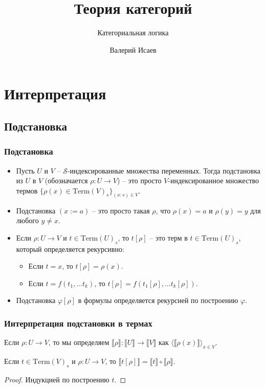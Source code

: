 \documentclass{beamer}
\theoremstyle{definition}
\renewcommand{\ll}{\llbracket}
\newcommand{\rr}{\rrbracket}
\newcommand{\fs}[1]{\mathrm{#1}}
\begin{document}
\title{Теория категорий}
\subtitle{Категориальная логика}
\author{Валерий Исаев}
\maketitle

\section{Интерпретация}

\subsection{Подстановка}

\begin{frame}
\frametitle{Подстановка}
\begin{itemize}
\item Пусть $U$ и $V$ -- $\mathcal{S}$-индексированные множества переменных. Тогда подстановка из $U$ в $V$ (обозначается $\rho : U \to V$) -- это просто $V$-индексированное множество термов $\{ \rho(x) \in \fs{Term}(V)_s \}_{(x : s) \in V}$.
\item Подстановка $(x := a)$ -- это просто такая $\rho$, что $\rho(x) = a$ и $\rho(y) = y$ для любого $y \neq x$.
\item Если $\rho : U \to V$ и $t \in \fs{Term}(U)_s$, то $t[\rho]$ -- это терм в $t \in \fs{Term}(U)_s$, который определяется рекурсивно:
\begin{itemize}
\item Если $t = x$, то $t[\rho] = \rho(x)$.
\item Если $t = f(t_1, \ldots t_k)$, то $t[\rho] = f(t_1[\rho], \ldots t_k[\rho])$.
\end{itemize}
\item Подстановка $\varphi[\rho]$ в формулы определяется рекурсией по построению $\varphi$.
\end{itemize}
\end{frame}

\begin{frame}
\frametitle{Интерпретация подстановки в термах}
Если $\rho : U \to V$, то мы определяем $\ll \rho \rr : \ll U \rr \to \ll V \rr$ как $\langle \ll \rho(x) \rr \rangle_{x \in V}$.
\begin{lem}
Если $t \in \fs{Term}(V)_s$ и $\rho : U \to V$, то $\ll t[\rho] \rr = \ll t \rr \circ \ll \rho \rr$.
\end{lem}
\begin{proof}
Индукцией по построению $t$.
\end{proof}
\end{frame}
\end{document}
